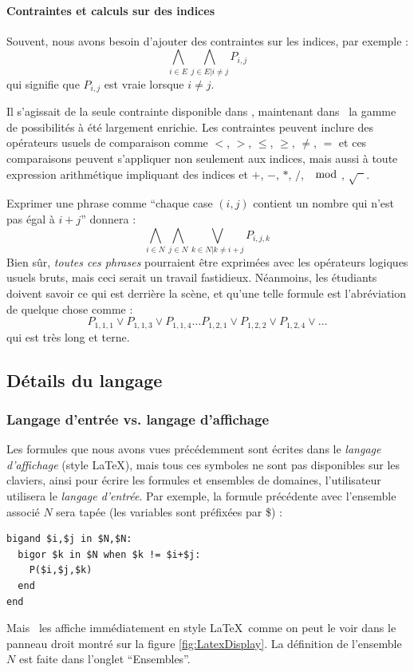\paragraph{Contraintes et calculs sur des indices}

Souvent, nous avons besoin d'ajouter des contraintes sur les indices, par exemple :
$$\bigwedge_{i \in E } \bigwedge_{j \in E  | i \neq j}P_{i,j}$$
qui signifie que $P_{i,j}$ est vraie lorsque $i\neq j$. 

Il s'agissait de la seule contrainte disponible dans \satoulouse, maintenant dans \touist\ la gamme de possibilités à été largement enrichie. Les contraintes peuvent inclure des opérateurs usuels de comparaison comme $<$, $>$, $\leq$, $\geq$, $\neq$, $=$ et ces comparaisons peuvent s'appliquer non seulement aux indices, mais aussi à toute expression arithmétique impliquant des indices et $+$, $-$, $*$, $/$, $\mod$, $\sqrt{\phantom{x}}$. 

Exprimer une phrase comme ``chaque case $(i,j)$ contient un nombre qui n'est pas égal à $i+j$'' donnera :
$$\bigwedge_{i \in N } \bigwedge_{j \in N} \bigvee_{k \in N|k\neq i+j} P_{i,j,k}$$
Bien s\^ur, \emph{toutes ces phrases} pourraient être exprimées avec les opérateurs logiques usuels bruts, mais ceci serait un travail fastidieux. Néanmoins, les étudiants doivent savoir ce qui est derrière la scène, et qu'une telle formule est l'abréviation de quelque chose comme :
$$P_{1,1,1}\vee P_{1,1,3}\vee P_{1,1,4}\ldots P_{1,2,1}\vee P_{1,2,2}\vee P_{1,2,4}\vee \ldots $$
qui est très long et terne.



\subsection{Détails du langage}

\subsubsection{Langage d'entrée vs. langage d'affichage}

Les formules que nous avons vues précédemment sont écrites dans le \emph{langage d'affichage} (style \LaTeX), mais tous ces symboles ne sont pas disponibles sur les claviers, ainsi pour écrire les formules et ensembles de domaines, l'utilisateur utilisera le \emph{langage d'entrée}.
Par exemple, la formule précédente avec l'ensemble associé $N$ sera tapée (les variables sont préfixées par \$) :
\begin{verbatim}
bigand $i,$j in $N,$N:
  bigor $k in $N when $k != $i+$j:
    P($i,$j,$k)
  end
end
\end{verbatim}
Mais \touist\ les affiche immédiatement en style \LaTeX\ comme on peut le voir dans le panneau droit montré sur la figure \ref{fig:LatexDisplay}.
La définition de l'ensemble $N$ est faite dans l'onglet ``Ensembles''.


